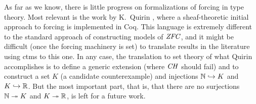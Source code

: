As far as we know, there is little progress on formalizations of
forcing in type theory. Most relevant is the work by K.~Quirin
\cite{Quirin}, where a sheaf-theoretic initial approach to forcing is
implemented in Coq. This language is extremely different to the
standard approach of constructing models of $\mathit{ZFC}$, and it might be
difficult (once the forcing machinery is set) to translate results in
the literature using ctms to this one. In any case, the translation to
set theory of what Quirin accomplishes is to define a generic
extension (where $\mathit{CH}$ should fail) and to construct a set $K$ (a
candidate counterexample) and injections $\mathbb{N}\hookrightarrow K$ and
$K\hookrightarrow\mathbb{R}$. But the most important part, that is, that there
are no surjections $\mathbb{N}\twoheadrightarrow K$ and
$K\twoheadrightarrow\mathbb{R}$, is left for a future
work. %

